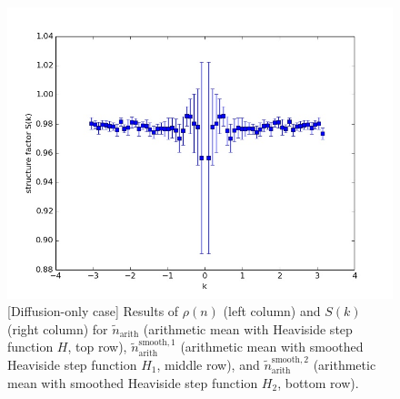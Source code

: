 \documentclass{article}
\begin{document}
\begin{figure}
\includegraphics[width=0.5\linewidth]{fig2/Sk_avg6.jpg}
\caption{\label{fig_diff_456}[Diffusion-only case] Results of $\rho(n)$ (left column) and $S(k)$ (right column) for $\tilde{n}_\mathrm{arith}$ (arithmetic mean with Heaviside step function $H$, top row), $\tilde{n}_\mathrm{arith}^{\mathrm{smooth},1}$ (arithmetic mean with smoothed Heaviside step function $H_1$, middle row), and $\tilde{n}_\mathrm{arith}^{\mathrm{smooth},2}$ (arithmetic mean with smoothed Heaviside step function $H_2$, bottom row).
}
\end{figure}
\end{document}
